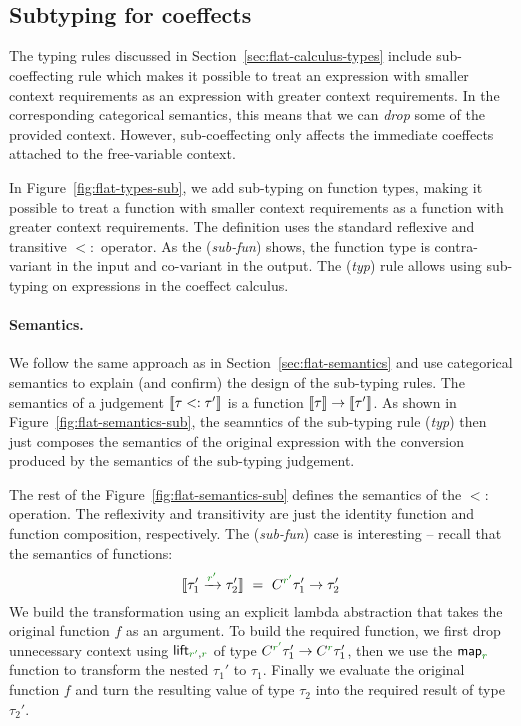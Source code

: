 ~

~

\subsection{Subtyping for coeffects}
\label{sec:flat-exts-sub}

The typing rules discussed in Section~\ref{sec:flat-calculus-types} include sub-coeffecting rule
which makes it possible to treat an expression with smaller context requirements as an expression
with greater context requirements. In the corresponding categorical semantics, this means that
we can \emph{drop} some of the provided context. However, sub-coeffecting only affects the 
immediate coeffects attached to the free-variable context.

In Figure~\ref{fig:flat-types-sub}, we add sub-typing on function types, making it possible to treat
a function with smaller context requirements as a function with greater context requirements. 
The definition uses the standard reflexive and transitive $<:$ operator. As the (\emph{sub-fun})
shows, the function type is contra-variant in the input and co-variant in the output. The 
(\emph{typ}) rule allows using sub-typing on expressions in the coeffect calculus.

\paragraph{Semantics.} We follow the same approach as in Section~\ref{sec:flat-semantics} and use
categorical semantics to explain (and confirm) the design of the sub-typing rules. The semantics
of a judgement $\llbracket \tau <: \tau' \rrbracket$ is a function $\llbracket \tau \rrbracket \rightarrow \llbracket \tau' \rrbracket$. 
As shown in Figure~\ref{fig:flat-semantics-sub}, the seamntics of the sub-typing rule (\emph{typ}) 
then just composes the semantics of the original expression with the conversion produced by the 
semantics of the sub-typing judgement.

The rest of the Figure~\ref{fig:flat-semantics-sub} defines the semantics of the $<:$ operation. 
The reflexivity and transitivity are just the identity function and function composition,
respectively. The (\emph{sub-fun}) case is interesting -- recall that the semantics of functions:
%
\begin{equation*}
\sem{\tau_1' \xrightarrow{\cclrd{r'}} \tau_2'} ~=~ C^{\cclrd{r'}} \tau_1' \rightarrow \tau_2'
\end{equation*}
%
We build the transformation using an explicit lambda abstraction that takes the original function
$f$ as an argument. To build the required function, we first drop unnecessary context using 
$\ident{lift}_{\cclrd{r'}, \cclrd{r}}$ of type $C^{\cclrd{r'}} \tau_1' \rightarrow C^{\cclrd{r}} \tau_1'$,
then we use the $\ident{map}_{\cclrd{r}}$ function to transform the nested $\tau_1'$ to $\tau_1$. 
Finally we evaluate the original function $f$ and turn the resulting value of type $\tau_2$ into 
the required result of type $\tau_2'$.

